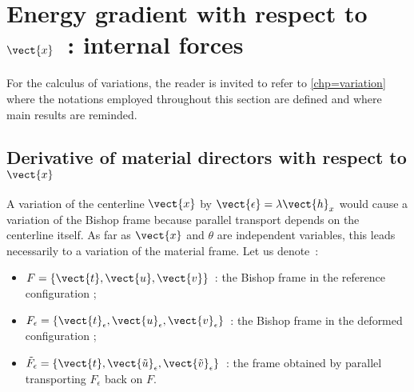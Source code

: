 \section{Energy gradient with respect to $\vect{x}$~: internal forces}\label{sec=dE_dx}

For the calculus of variations, the reader is invited to refer to \cref{chp=variation} where the notations employed throughout this section are defined and where main results are reminded.

\subsection{Derivative of material directors with respect to $\vect{x}$}
A variation of the centerline $\vect{x}$ by $\vect{\epsilon} = \lambda \vect{h}_x$ would cause a variation of the Bishop frame because parallel transport depends on the centerline itself. As far as $\vect{x}$ and $\theta$ are independent variables, this leads necessarily to a variation of the material frame. Let us denote~:
\begin{itemize}
\item
$F = \{\vect{t}, \vect{u},\vect{v}\}$~: the Bishop frame in the reference configuration ;
\item
 $F_\epsilon = \{\vect{t}_\epsilon, \vect{u}_\epsilon,\vect{v}_\epsilon\}$~: the Bishop frame in the deformed configuration ;
 \item
$\tilde{F}_\epsilon = \{\vect{t}, \vect{\tilde{u}}_\epsilon,\vect{\tilde{v}}_\epsilon\}$~: the frame obtained by parallel transporting $F_\epsilon$ back on $F$.
\end{itemize}



